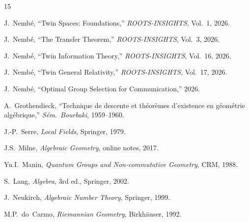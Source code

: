 \documentclass[11pt,twocolumn]{article}
\theoremstyle{plain}
\theoremstyle{definition}
\theoremstyle{remark}
\begin{document}
\begin{thebibliography}{15}

 J.~Nemb\'e, ``Twin Spaces: Foundations,'' \emph{ROOTS-INSIGHTS}, Vol.~1, 2026.

 J.~Nemb\'e, ``The Transfer Theorem,'' \emph{ROOTS-INSIGHTS}, Vol.~3, 2026.

 J.~Nemb\'e, ``Twin Information Theory,'' \emph{ROOTS-INSIGHTS}, Vol.~16, 2026.

 J.~Nemb\'e, ``Twin General Relativity,'' \emph{ROOTS-INSIGHTS}, Vol.~17, 2026.

 J.~Nemb\'e, ``Optimal Group Selection for Communication,'' 2026.

 A.~Grothendieck, ``Technique de descente et th\'eor\`emes d'existence en g\'eom\'etrie alg\'ebrique,'' \emph{S\'em.\ Bourbaki}, 1959--1960.

 J.-P.~Serre, \emph{Local Fields}, Springer, 1979.

 J.S.~Milne, \emph{Algebraic Geometry}, online notes, 2017.

 Yu.I.~Manin, \emph{Quantum Groups and Non-commutative Geometry}, CRM, 1988.

 S.~Lang, \emph{Algebra}, 3rd ed., Springer, 2002.

 J.~Neukirch, \emph{Algebraic Number Theory}, Springer, 1999.

 M.P.~do~Carmo, \emph{Riemannian Geometry}, Birkh\"auser, 1992.

\end{thebibliography}
\end{document}
